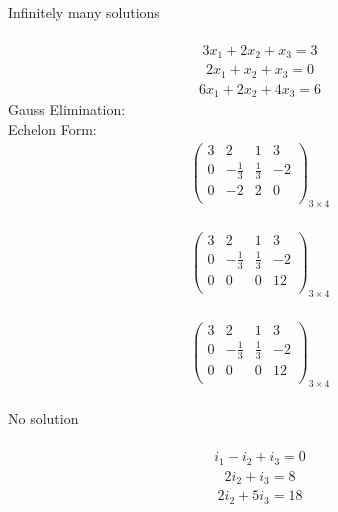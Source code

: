 \documentclass{article}
\begin{document}
\\
Infinitely many solutions\\
\\
\begin{align*}
3x_{1} + 2x_{2} + x_{3} = 3\end{align*}
\begin{align*}
2x_{1} + x_{2} + x_{3} = 0\end{align*}
\begin{align*}
6x_{1} + 2x_{2} + 4x_{3} = 6\end{align*}
Gauss Elimination:\\
Echelon Form:\\
\begin{align*}
\left(
\begin{array}{ccc|c}
3 & 2 & 1 & 3\\
0 & -\frac{1}{3} & \frac{1}{3} & -2\\
0 & -2 & 2 & 0\\
\end{array}
\right)_{3\times 4}
\end{align*}
\\
\begin{align*}
\left(
\begin{array}{ccc|c}
3 & 2 & 1 & 3\\
0 & -\frac{1}{3} & \frac{1}{3} & -2\\
0 & 0 & 0 & 12\\
\end{array}
\right)_{3\times 4}
\end{align*}
\\
\begin{align*}
\left(
\begin{array}{ccc|c}
3 & 2 & 1 & 3\\
0 & -\frac{1}{3} & \frac{1}{3} & -2\\
0 & 0 & 0 & 12\\
\end{array}
\right)_{3\times 4}
\end{align*}
\\
No solution\\
\\
\begin{align*}
i_{1} - i_{2} + i_{3} = 0\end{align*}
\begin{align*}
2i_{2} + i_{3} = 8\end{align*}
\begin{align*}
2i_{2} + 5i_{3} = 18\end{align*}
\end{document}
